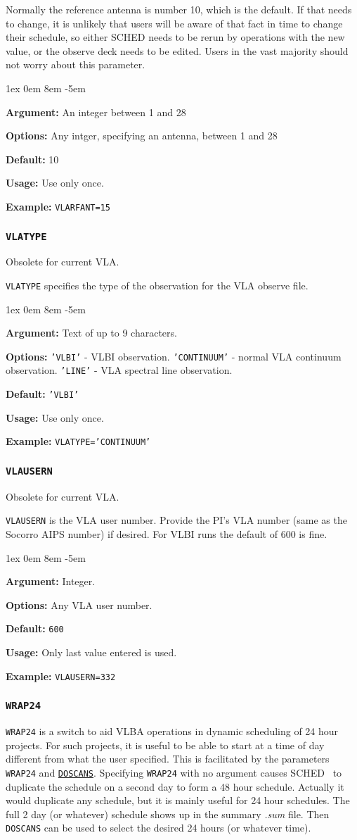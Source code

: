 \documentclass{report}
\newcommand{\schedb}{{\sc SCHED~}}
\newcommand{\rcwbox}[5]{
  \begin{list}{}{\parsep 1ex  \itemsep 0em
                 \leftmargin 8em  \itemindent -5em }
    \item {\bf Argument:} #1
    \item {\bf Options:}  #2
    \item {\bf Default:}  #3
    \item {\bf Usage:}    #4
    \item {\bf Example:}  #5
  \end{list}
}
\begin{document}
Normally the reference antenna is number 10, which is the default.
If that needs to change, it is unlikely that users will be aware of
that fact in time to change their schedule, so either SCHED needs to
be rerun by operations with the new value, or the observe deck needs
to be edited.  Users in the vast majority should not worry about this
parameter.

\rcwbox
{An integer between 1 and 28}
{Any intger, specifying an antenna, between 1 and 28}
{10}
{Use only once.}
{{\tt VLARFANT=15}}



\subsubsection{\label{MP:VLATYPE}{\tt VLATYPE}}

Obsolete for current VLA.

{\tt VLATYPE} specifies the type of the observation
for the VLA observe file.

\rcwbox
{Text of up to 9 characters.}
{{\tt 'VLBI'}      - VLBI observation.
 {\tt 'CONTINUUM'} - normal VLA continuum observation.
 {\tt 'LINE'}      - VLA spectral line observation.}
{{\tt 'VLBI'}}
{Use only once.}
{{\tt VLATYPE='CONTINUUM'}}


\subsubsection{\label{MP:VLAUSERN}{\tt VLAUSERN}}

Obsolete for current VLA.

{\tt VLAUSERN} is the VLA user number. Provide the PI's VLA number
(same as the Socorro AIPS number) if desired. For VLBI runs the
default of 600 is fine.

\rcwbox
{Integer.}
{Any VLA user number.}
{{\tt 600}}
{Only last value entered is used.}
{{\tt VLAUSERN=332}}


\subsubsection{\label{MP:WRAP24}{\tt WRAP24}}

{\tt WRAP24} is a switch to aid VLBA operations in dynamic scheduling
of 24 hour projects.  For such projects, it is useful to be able to
start at a time of day different from what the user specified.  This
is facilitated by the parameters {\tt WRAP24} and 
{\hyperref[MP:DOSCANS]{{\tt DOSCANS}}}.
Specifying {\tt WRAP24} with no argument causes \schedb
to duplicate the schedule on a second day to form a 48 hour schedule.  
Actually it would duplicate any schedule, but it is mainly useful for
24 hour schedules.  The full 2 day (or whatever) schedule shows up in
the summary {\sl .sum} file.  Then {\tt DOSCANS} can be used to select
the desired 24 hours (or whatever time).
\end{document}
